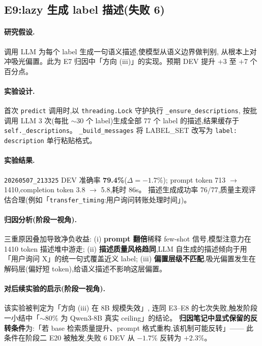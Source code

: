\documentclass[11pt,a4paper]{ctexart}
\begin{document}
\subsection{E9:lazy 生成 label 描述(失败 6)}

\paragraph{研究假设.}调用 LLM 为每个 label 生成一句语义描述,使模型从语义边界做判别,
从根本上对冲吸光偏置。此为 E7 归因中「方向 (iii)」的实现。预期 DEV 提升 $+3$ 至 $+7$ 个百分点。

\paragraph{实验设计.}首次 \texttt{predict} 调用时,以 \texttt{threading.Lock} 守护执行 \texttt{\_ensure\_descriptions},
按批调用 LLM 3 次(每批 $\sim 30$ 个 label)生成全部 77 个 label 的描述,结果缓存于 \texttt{self.\_descriptions}。
\texttt{\_build\_messages} 将 LABEL\_SET 改写为 \verb|label: description| 单行粘贴格式。

\paragraph{实验结果.}\texttt{20260507\_213325} DEV 准确率 \textbf{79.4\%}($\Delta = -1.7\%$);
prompt token 713 $\to$ 1410,completion token 3.8 $\to$ 5.8,耗时 86s。
描述生成成功率 76/77,质量主观评估合理(例如「\texttt{transfer\_timing}:用户询问转账处理时间」)。

\paragraph{归因分析(阶段一视角).}三重原因叠加导致净负收益:
(i) \textbf{prompt 翻倍}稀释 few-shot 信号,模型注意力在 1410 token 描述堆中游走;
(ii) \textbf{描述质量风格趋同},LLM 自生成的描述倾向于用「用户询问 X」的统一句式覆盖近义 label;
(iii) \textbf{偏置层级不匹配},吸光偏置发生在解码层(偏好短 token),给语义描述不影响这层偏置。

\paragraph{对后续实验的启示(阶段一视角).}该实验被判定为「方向 (iii) 在 8B 规模失效」,
连同 E3--E8 的七次失败,触发阶段一小结中「$\sim 80\%$ 为 Qwen3-8B 真实 ceiling」的结论。
\textbf{归因笔记中显式保留的反转条件}为:「若 base 检索质量提升、prompt 格式重构,该机制可能反转」——
此条件在阶段二 E20 被触发,失败 6 DEV 从 $-1.7\%$ 反转为 $+2.3\%$。
\end{document}
